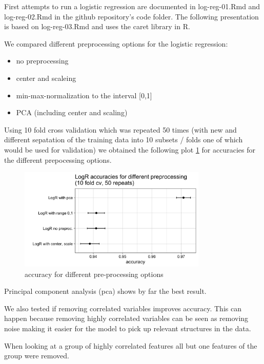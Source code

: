 \documentclass[]{article}
\providecommand{\tightlist}{%
  \setlength{\itemsep}{0pt}\setlength{\parskip}{0pt}}
\begin{document}
First attempts to run a logistic regression are documented in
log-reg-01.Rmd and log-reg-02.Rmd in the github repository's code
folder. The following presentation is based on log-reg-03.Rmd and uses
the caret library in R.

We compared different preprocessing options for the logistic regression:

\begin{itemize}
\tightlist
\item
  no preprocessing
\item
  center and scaleing
\item
  min-max-normalization to the interval {[}0,1{]}
\item
  PCA (including center and scaling)
\end{itemize}

Using 10 fold cross validation which was repeated 50 times (with new and
different sepatation of the training data into 10 subsets / folds one of
which would be used for validation) we obtained the following plot
\ref{fig:pre-proc-options} for accuracies for the different prepocessing
options.

\begin{figure}
    \centering
    \includegraphics[width=0.8\textwidth]{images/preprocessing-options.png}
    \caption{accuracy for different pre-processing options}
    \label{fig:pre-proc-options}
\end{figure}

Principal component analysis (pca) shows by far the best result.

We also tested if removing correlated variables improves accuracy. This
can happen because removing highly correlated variables can be seen as
removing noise making it easier for the model to pick up relevant
structures in the data.

When looking at a group of highly correlated features all but one
features of the group were removed.
\end{document}
